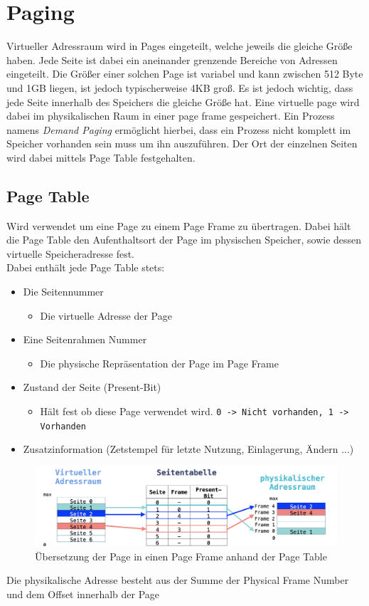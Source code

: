 \documentclass{article}
\begin{document}
	\section{Paging}
	Virtueller Adressraum wird in Pages eingeteilt, welche jeweils die gleiche Größe haben. Jede Seite ist dabei ein aneinander grenzende Bereiche von Adressen eingeteilt. Die Größer einer solchen Page ist variabel und kann zwischen 512 Byte und 1GB liegen, ist jedoch typischerweise 4KB groß. Es ist jedoch wichtig, dass jede Seite innerhalb des Speichers die gleiche Größe hat. Eine virtuelle page wird dabei im physikalischen Raum in einer page frame gespeichert. Ein Prozess namens \textit{Demand Paging} ermöglicht hierbei, dass ein Prozess nicht komplett im Speicher vorhanden sein muss um ihn auszuführen. Der Ort der einzelnen Seiten wird dabei mittels Page Table festgehalten.
	\subsection{Page Table}
	Wird verwendet um eine Page zu einem Page Frame zu übertragen. Dabei hält die Page Table den Aufenthaltsort der Page im physischen Speicher, sowie dessen virtuelle Speicheradresse fest. \\
	Dabei enthält jede Page Table stets:
	\begin{itemize}
		\item{Die Seitennummer}
		\begin{itemize}
			\item{Die virtuelle Adresse der Page}
		\end{itemize}
		\item{Eine Seitenrahmen Nummer}
		\begin{itemize}
			\item{Die physische Repräsentation der Page im Page Frame}
		\end{itemize}
		\item{Zustand der Seite (Present-Bit)}
		\begin{itemize}
			\item{Hält fest ob diese Page verwendet wird. \verb|0 -> Nicht vorhanden, 1 -> Vorhanden|}
		\end{itemize}
		\item{Zusatzinformation (Zetstempel für letzte Nutzung, Einlagerung, Ändern ...)}
	\end{itemize}
	\begin{figure}[H]
	\centering
	\includegraphics[scale=0.5]{Bilder/pagetable.png}
	\caption{Übersetzung der Page in einen Page Frame anhand der Page Table}
	\end{figure}
	Die physikalische Adresse besteht aus der Summe der Physical Frame Number und dem Offset innerhalb der Page
\end{document}
